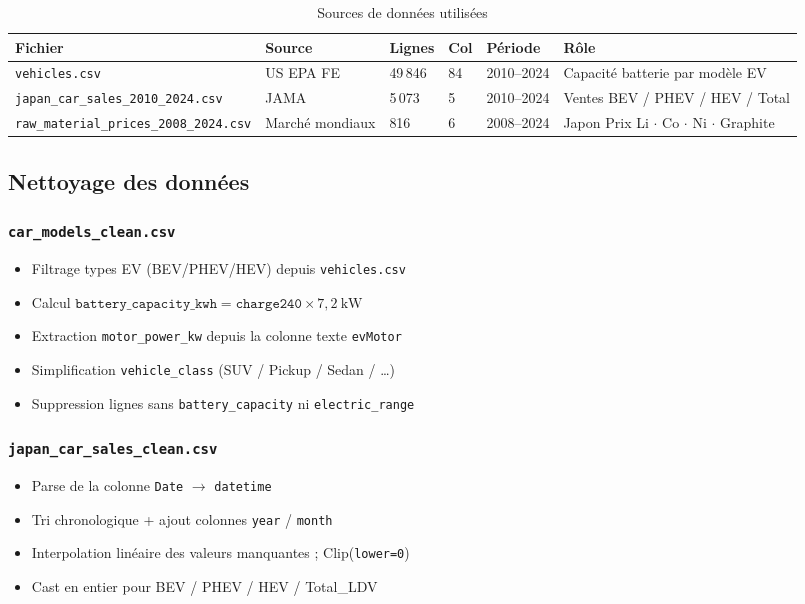 \documentclass[12pt,a4paper]{article}
\begin{document}
\begin{table}[H]
\centering
\caption{Sources de données utilisées}
\begin{tabular}{lllllp{5cm}}
\toprule
\textbf{Fichier} & \textbf{Source} & \textbf{Lignes} & \textbf{Col} & \textbf{Période} & \textbf{Rôle} \\
\midrule
\texttt{vehicles.csv}
  & US EPA FE & 49\,846 & 84 & 2010--2024
  & Capacité batterie par modèle EV \\
\texttt{japan\_car\_sales\_2010\_2024.csv}
  & JAMA & 5\,073 & 5 & 2010--2024
  & Ventes BEV / PHEV / HEV / Total \\
\texttt{raw\_material\_prices\_2008\_2024.csv}
  & Marché mondiaux & 816 & 6 & 2008--2024
  & Japon Prix Li $\cdot$ Co $\cdot$ Ni $\cdot$ Graphite \\
\bottomrule
\end{tabular}
\end{table}

\subsection{Nettoyage des données}

\subsubsection{\texttt{car\_models\_clean.csv}}
\begin{itemize}
  \item Filtrage types EV (BEV/PHEV/HEV) depuis \texttt{vehicles.csv}
  \item Calcul $\texttt{battery\_capacity\_kwh} = \texttt{charge240} \times 7{,}2\ \text{kW}$
  \item Extraction \texttt{motor\_power\_kw} depuis la colonne texte \texttt{evMotor}
  \item Simplification \texttt{vehicle\_class} (SUV / Pickup / Sedan / \ldots)
  \item Suppression lignes sans \texttt{battery\_capacity} ni \texttt{electric\_range}
\end{itemize}

\subsubsection{\texttt{japan\_car\_sales\_clean.csv}}
\begin{itemize}
  \item Parse de la colonne \texttt{Date} $\to$ \texttt{datetime}
  \item Tri chronologique + ajout colonnes \texttt{year} / \texttt{month}
  \item Interpolation linéaire des valeurs manquantes ; Clip(\texttt{lower=0})
  \item Cast en entier pour BEV / PHEV / HEV / Total\_LDV
\end{itemize}
\end{document}
